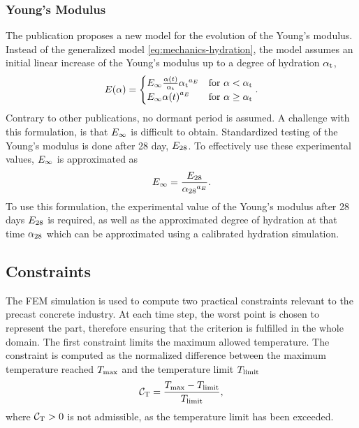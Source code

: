 \subsubsection{Young's Modulus}
The publication \cite{car_2016_mamt} proposes a new model for the evolution of the Young's modulus.
Instead of the generalized model \eqref{eq:mechanics-hydration}, the model assumes an initial linear increase of the Young's modulus up to a degree of hydration $\alpha_{\text{t}}$,
\begin{align}
	E(\alpha) = 
	\begin{cases}
		E_\infty \frac{\alpha(t)}{\alpha_{\text{t}}}{\alpha_{\text{t}}}^{a_{E}}   
		& \text{for $\alpha < \alpha_{\text{t}}$}\\
		E_\infty {\alpha(t)}^{a_{E}}  
		& \text{for $\alpha \ge \alpha_{\text{t}}$}
	\end{cases}\label{eq:EwrtDOH}.
\end{align}
Contrary to other publications, no dormant period is assumed.
A challenge with this formulation, is that $E_\infty$ is difficult to obtain.
Standardized testing of the Young's modulus is done after 28 day, $E_{28}$.
To effectively use these experimental values, $E_\infty$ is approximated as
\begin{align}
	E_\infty = \dfrac{E_{28}}{{\alpha_{28}}^{a_{E}}}.
\end{align}
To use this formulation, the experimental value of the Young's modulus after 28 days $E_{28}$ is required, as well as the approximated degree of hydration at that time $\alpha_{28}$ which can be approximated using a calibrated hydration simulation.


\subsection{Constraints}
The FEM simulation is used to compute two practical constraints relevant to the precast concrete industry.
At each time step, the worst point is chosen to represent the part, therefore ensuring that the criterion is fulfilled in the whole domain.
The first constraint limits the maximum allowed temperature.
The constraint is computed as the normalized difference between the maximum temperature reached $T_{\text{max}}$ and the temperature limit $T_{\text{limit}}$ 
\begin{align}
	\mathcal{C}_{\text{T}} = \frac{T_{\text{max}} - T_{\text{limit}}}{T_{\text{limit}}}, \label{eq:concstraintT}
\end{align}
where $\mathcal{C}_{\text{T}} > 0$ is not admissible, as the temperature limit has been exceeded.\\

